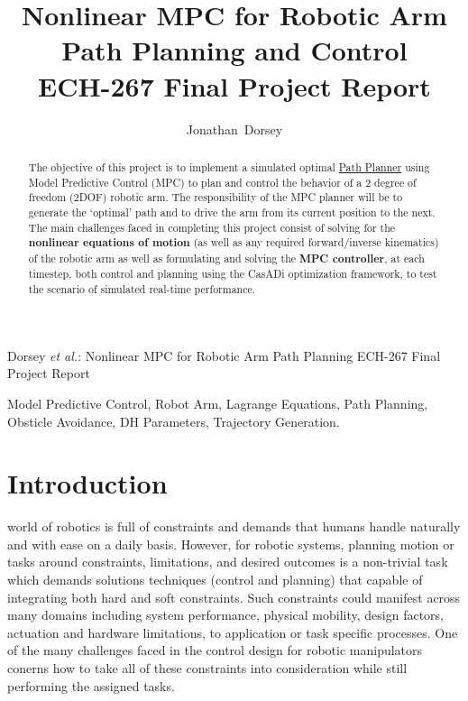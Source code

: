 \documentclass[journal]{IEEEtran}
\begin{document}
\title{Nonlinear MPC for Robotic Arm Path Planning and Control \\ ECH-267 Final Project Report}


\author{Jonathan~Dorsey }



%
{Dorsey \MakeLowercase{\textit{et al.}}: Nonlinear MPC for Robotic Arm Path Planning ECH-267 Final Project Report}

\maketitle

\begin{abstract}
  The objective of this project is to implement a simulated optimal \underline{Path Planner} using Model Predictive Control (MPC) to plan and control the behavior of a 2 degree of freedom (2DOF) robotic arm. The responsibility of the MPC planner will be to generate the `optimal' path and to drive the arm from its current position to the next. The main challenges faced in completing this project consist of solving for the \textbf{nonlinear equations of motion} (as well as any required forward/inverse kinematics) of the robotic arm as well as formulating and solving the \textbf{MPC controller}, at each timestep, both control and planning using the CasADi optimization framework, to test the scenario of simulated real-time performance.
\end{abstract}

\begin{IEEEkeywords}
Model Predictive Control, Robot Arm, Lagrange Equations, Path Planning, Obsticle Avoidance, DH Parameters, Trajectory Generation.
\end{IEEEkeywords}


\IEEEpeerreviewmaketitle

\section{Introduction}

 world of robotics is full of constraints and demands that humans handle naturally and with ease on a daily basis. However, for robotic systems, planning motion or tasks around constraints, limitations, and desired outcomes is a non-trivial task which demands solutions techniques (control and planning) that capable of integrating both hard and soft constraints. Such constraints could manifest across many domains including system performance, physical mobility, design factors, actuation and hardware limitations, to application or task specific processes. One of the many challenges faced in the control design for robotic manipulators conerns how to take all of these constraints into consideration while still performing the assigned tasks. \\
\end{document}
